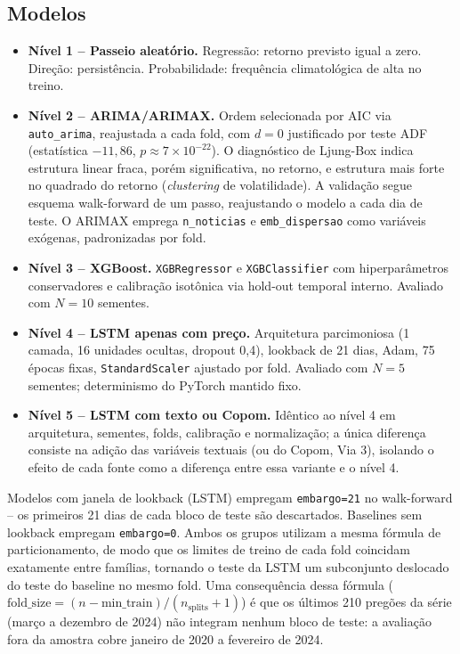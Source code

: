 \documentclass[conference]{IEEEtran}
\begin{document}
\subsection{Modelos}

\begin{itemize}
\item \textbf{N\'ivel 1 -- Passeio aleat\'orio.} Regress\~ao: retorno previsto igual a zero. Dire\c{c}\~ao: persist\^encia. Probabilidade: frequ\^encia climatol\'ogica de alta no treino.
\item \textbf{N\'ivel 2 -- ARIMA/ARIMAX.} Ordem selecionada por AIC via \texttt{auto\_arima}, reajustada a cada fold, com $d=0$ justificado por teste ADF (estat\'istica $-11{,}86$, $p\approx7\times10^{-22}$). O diagn\'ostico de Ljung-Box indica estrutura linear fraca, por\'em significativa, no retorno, e estrutura mais forte no quadrado do retorno (\emph{clustering} de volatilidade). A valida\c{c}\~ao segue esquema walk-forward de um passo, reajustando o modelo a cada dia de teste. O ARIMAX emprega \texttt{n\_noticias} e \texttt{emb\_dispersao} como vari\'aveis ex\'ogenas, padronizadas por fold.
\item \textbf{N\'ivel 3 -- XGBoost.} \texttt{XGBRegressor} e \texttt{XGBClassifier} com hiperpar\^ametros conservadores e calibra\c{c}\~ao isot\^onica via hold-out temporal interno. Avaliado com $N=10$ sementes.
\item \textbf{N\'ivel 4 -- LSTM apenas com pre\c{c}o.} Arquitetura parcimoniosa (1 camada, 16 unidades ocultas, dropout 0,4), lookback de 21 dias, Adam, 75 \'epocas fixas, \texttt{StandardScaler} ajustado por fold. Avaliado com $N=5$ sementes; determinismo do PyTorch mantido fixo.
\item \textbf{N\'ivel 5 -- LSTM com texto ou Copom.} Id\^entico ao n\'ivel 4 em arquitetura, sementes, folds, calibra\c{c}\~ao e normaliza\c{c}\~ao; a \'unica diferen\c{c}a consiste na adi\c{c}\~ao das vari\'aveis textuais (ou do Copom, Via 3), isolando o efeito de cada fonte como a diferen\c{c}a entre essa variante e o n\'ivel 4.
\end{itemize}

Modelos com janela de lookback (LSTM) empregam \texttt{embargo=21} no walk-forward -- os primeiros 21 dias de cada bloco de teste s\~ao descartados. Baselines sem lookback empregam \texttt{embargo=0}. Ambos os grupos utilizam a mesma f\'ormula de particionamento, de modo que os limites de treino de cada fold coincidam exatamente entre fam\'ilias, tornando o teste da LSTM um subconjunto deslocado do teste do baseline no mesmo fold. Uma consequ\^encia dessa f\'ormula ($\text{fold\_size}=(n-\text{min\_train})/(n_{\text{splits}}+1)$) \'e que os \'ultimos 210 preg\~oes da s\'erie (mar\c{c}o a dezembro de 2024) n\~ao integram nenhum bloco de teste: a avalia\c{c}\~ao fora da amostra cobre janeiro de 2020 a fevereiro de 2024.
\end{document}
